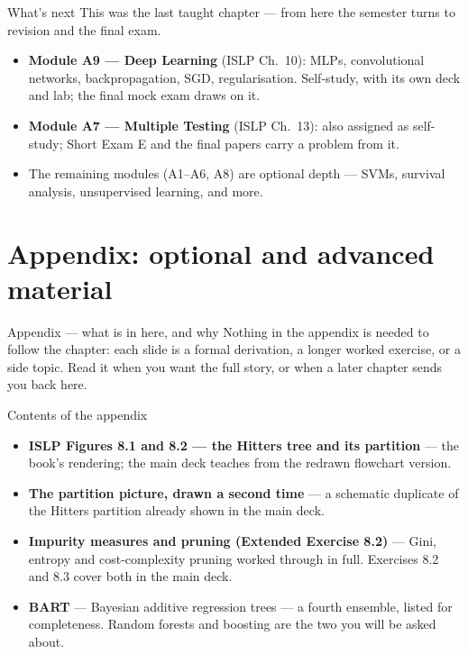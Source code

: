 \documentclass[aspectratio=169,11pt]{beamer}
\begin{document}
\begin{frame}{What's next}
  This was the last taught chapter --- from here the semester turns to
  revision and the final exam.
  \begin{itemize}
    \item \textbf{Module A9 --- Deep Learning} (ISLP Ch.\ 10): MLPs,
          convolutional networks, backpropagation, SGD, regularisation.
          Self-study, with its own deck and lab; the final mock exam
          draws on it.
    \item \textbf{Module A7 --- Multiple Testing} (ISLP Ch.\ 13): also
          assigned as self-study; Short Exam E and the final papers carry
          a problem from it.
    \item The remaining modules (A1--A6, A8) are optional depth ---
          SVMs, survival analysis, unsupervised learning, and more.
  \end{itemize}
\end{frame}


\appendix
\AtBeginSection[]{}
\section{Appendix: optional and advanced material}

\begin{frame}{Appendix --- what is in here, and why}
  \small
  Nothing in the appendix is needed to follow the chapter: each slide is a
  formal derivation, a longer worked exercise, or a side topic. Read it when
  you want the full story, or when a later chapter sends you back here.
  \begin{block}{Contents of the appendix}
    \begin{itemize}
      \item \textbf{ISLP Figures 8.1 and 8.2 --- the Hitters tree and its partition} --- the book's rendering; the main deck teaches from the redrawn flowchart version.
      \item \textbf{The partition picture, drawn a second time} --- a schematic duplicate of the Hitters partition already shown in the main deck.
      \item \textbf{Impurity measures and pruning (Extended Exercise 8.2)} --- Gini, entropy and cost-complexity pruning worked through in full. Exercises 8.2 and 8.3 cover both in the main deck.
      \item \textbf{BART} --- Bayesian additive regression trees --- a fourth ensemble, listed for completeness. Random forests and boosting are the two you will be asked about.
    \end{itemize}
  \end{block}
\end{frame}
\end{document}
